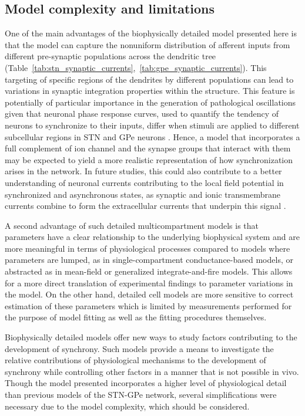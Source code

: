 %
%
%

%
%
%
%
%
%

%
\subsection{Model complexity and limitations}
\label{sec:ch3-limitations}

%
%
%
%
%
One of the main advantages of the biophysically detailed model presented here is that the model can capture the nonuniform distribution of afferent inputs from different pre-synaptic populations across the dendritic tree (Table~\ref{tab:stn_synaptic_currents},~\ref{tab:gpe_synaptic_currents}). This targeting of specific regions of the dendrites by different populations can lead to variations in synaptic integration properties within the structure. This feature is potentially of particular importance in the generation of pathological oscillations given that neuronal phase response curves, used to quantify the tendency of neurons to synchronize to their inputs, differ when stimuli are applied to different subcellular regions in STN and GPe neurons \cite{schultheiss_phase_2010,farries_phase_2012}. Hence, a model that incorporates a full complement of ion channel and the synapse groups that interact with them may be expected to yield a more realistic representation of how synchronization arises in the network. In future studies, this could also contribute to a better understanding of neuronal currents contributing to the local field potential in synchronized and asynchronous states, as synaptic and ionic transmembrane currents combine to form the extracellular currents that underpin this signal \cite{buzsaki_origin_2012}.
%

%
%
A second advantage of such detailed multicompartment models is that parameters have a clear relationship to the underlying biophysical system and are more meaningful in terms of physiological processes compared to models where parameters are lumped, as in single-compartment conductance-based models, or abstracted as in mean-field or generalized integrate-and-fire models. This allows for a more direct translation of experimental findings to parameter variations in the model. On the other hand, detailed cell models are more sensitive to correct estimation of these parameters which is limited by measurements performed for the purpose of model fitting as well as the fitting procedures themselves.

%
%
Biophysically detailed models offer new ways to study factors contributing to the development of synchrony. Such models provide a means to investigate the relative contributions of physiological mechanisms to the development of synchrony while controlling other factors in a manner that is not possible in vivo. Though the model presented incorporates a higher level of physiological detail than previous models of the STN-GPe network, several simplifications were  necessary due to the model complexity, which should be considered.

